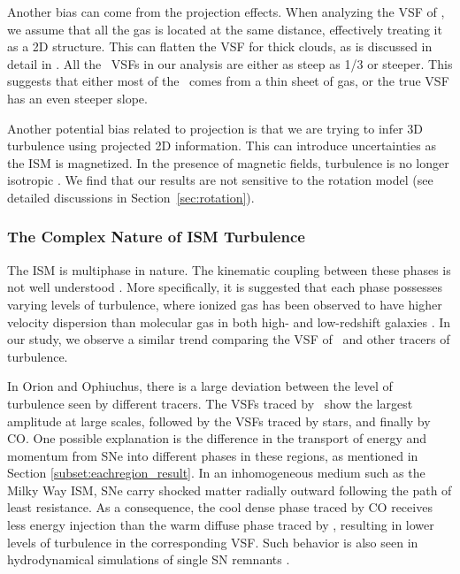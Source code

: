 Another bias can come from the projection effects. When analyzing the VSF of \halpha, we assume that all the gas is located at the same distance, effectively treating it as a 2D structure. This can flatten the VSF for thick clouds, as is discussed in detail in \citet{qian_new_2015, xu_projected_2020, mohapatra_velocity_2022}. All the \halpha~VSFs in our analysis are either as steep as 1/3 or steeper. This suggests that either most of the \halpha~comes from a thin sheet of gas, or the true VSF has an even steeper slope.

Another potential bias related to projection is that we are trying to infer 3D turbulence using projected 2D information. This can introduce uncertainties as the ISM is magnetized. In the presence of magnetic fields, turbulence is no longer isotropic \citep{seifried_impact_2015, hu_anisotropic_2021}. We find that our results are not sensitive to the rotation model (see detailed discussions in Section~\ref{sec:rotation}). 

\subsubsection{The Complex Nature of ISM Turbulence}
\label{sec:nature_ISM}

The ISM is multiphase in nature. The kinematic coupling between these phases is not well understood \citep[for a review of the multiphase ISM model, see][]{cox_three-phase_2005}. More specifically, it is suggested that each phase possesses varying levels of turbulence, where ionized gas has been observed to have higher velocity dispersion than molecular gas in both high- and low-redshift galaxies \citep[][]{girard_systematic_2021,ejdetjarn_giant_2022}. In our study, we observe a similar trend comparing the VSF of \halpha~and other tracers of turbulence.

In Orion and Ophiuchus, there is a large deviation between the level of turbulence seen by different tracers. The VSFs traced by \halpha~show the largest amplitude at large scales, followed by the VSFs traced by stars, and finally by CO\@. One possible explanation is the difference in the transport of energy and momentum from SNe into different phases in these regions, as mentioned in Section \ref{subset:eachregion_result}. In an inhomogeneous medium such as the Milky Way ISM, SNe carry shocked matter radially outward following the path of least resistance. As a consequence, the cool dense phase traced by CO receives less energy injection than the warm diffuse phase traced by \halpha, resulting in lower levels of turbulence in the corresponding VSF\@. Such behavior is also seen in hydrodynamical simulations of single SN remnants \citep[e.g.,][]{martizzi_supernova_2015,li_supernova_2015}.

